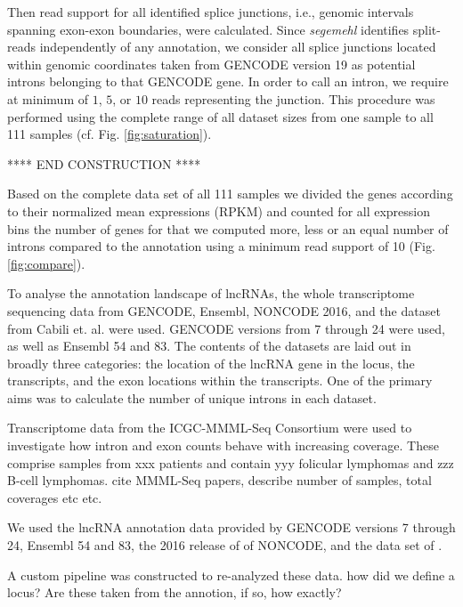 \documentclass[ncrna,article,submit,moreauthors,pdftex,10pt,a4paper]{mdpi}
\newcommand{\TODO}[1]{\begingroup\color{red}#1\endgroup}
\begin{document}
Then read support for all identified splice junctions, i.e., genomic
intervals spanning exon-exon boundaries, were calculated. Since
\textit{segemehl} identifies split-reads independently of any annotation,
we consider all splice junctions located within genomic coordinates taken
from GENCODE version 19 as potential introns belonging to that GENCODE
gene. In order to call an intron, we require at minimum of $1$, $5$, or
$10$ reads representing the junction.  This procedure was performed using
the complete range of all dataset sizes from one sample to all 111 samples
(cf. Fig. \ref{fig:saturation}).

\TODO{**** END CONSTRUCTION ****}

Based on the complete data set of all 111 samples we divided the genes according to their normalized mean expressions (RPKM) and counted for all expression bins the number of genes for that we computed more, less or an equal number of introns compared to the annotation using a minimum read support of 10 (Fig. \ref{fig:compare}). 

To analyse the annotation landscape of lncRNAs, the whole transcriptome sequencing data from GENCODE, Ensembl, NONCODE 2016, 
and the dataset from Cabili et. al. were used. GENCODE versions from 7 through 24 were used, as well as Ensembl 54 and 83.
The contents of the datasets are laid out in broadly three categories: the location of the lncRNA gene in the locus, 
the transcripts, and the exon locations within the transcripts. One of the primary aims was to calculate
the number of unique introns in each dataset. 




\begingroup\color{blue} 
Transcriptome data from the ICGC-MMML-Seq Consortium were used to
investigate how intron and exon counts behave with increasing coverage.
These comprise samples from \TODO{xxx} patients and contain \TODO{yyy}
folicular lymphomas and \TODO{zzz} B-cell lymphomas.
  \TODO{cite MMML-Seq
  papers, describe number of samples, total coverages etc etc.}

We used the lncRNA annotation data provided by GENCODE versions 7 through
24, Ensembl 54 and 83, the 2016 release of of NONCODE, and the data set of
\cite{cabili2011}. 

A custom pipeline was constructed to re-analyzed these data. 
\TODO{how did we define a locus? Are these taken from the annotion, if so,
how exactly?} 




 
\end{document}
